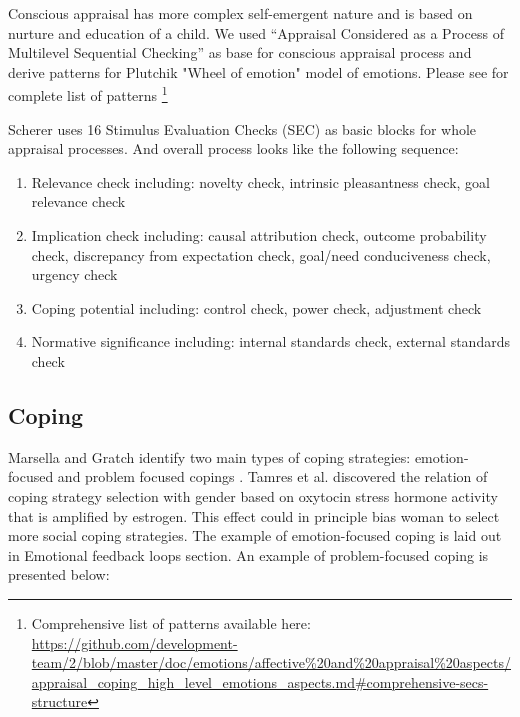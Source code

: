 Conscious appraisal has more complex self-emergent nature and is based on nurture and education of a child. We used ``Appraisal Considered as a Process of Multilevel Sequential Checking'' \cite{appraisal_considered_as_a_process} as base for conscious appraisal process and derive patterns for Plutchik "Wheel of emotion" model of emotions. Please see for complete list of patterns
\footnote{Comprehensive list of patterns available here: \url{
https://github.com/development-team/2/blob/master/doc/emotions/affective\%20and\%20appraisal\%20aspects/appraisal_coping_high_level_emotions_aspects.md#comprehensive-secs-structure}}

Scherer uses 16 Stimulus Evaluation Checks (SEC) as basic blocks for whole appraisal processes. And overall process looks like the following sequence:

\begin{enumerate}
 \item  Relevance check including: novelty check, intrinsic pleasantness check, goal relevance check
 \item  Implication check including: causal attribution check, outcome probability check, discrepancy from expectation check, goal/need conduciveness check, urgency check
 \item  Coping potential including: control check, power check, adjustment check
 \item  Normative significance including: internal standards check, external standards check
\end{enumerate}

\subsection{Coping}

Marsella and Gratch identify two main types of coping strategies: emotion-focused and problem focused copings \cite{dont_worry_be_happy}. Tamres et al. discovered the relation of coping strategy selection with gender \cite{sex_differencies} based on oxytocin stress hormone activity that is amplified by estrogen. This effect could in principle bias woman to select more social coping strategies.
The example of emotion-focused coping is laid out in Emotional feedback loops section.
An example of problem-focused coping is presented below:

